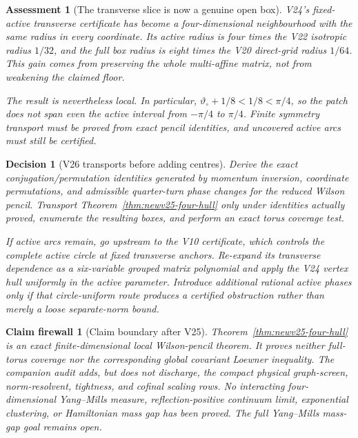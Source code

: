 \documentclass[11pt,oneside]{article}
\newtheorem{assessment}[theorem]{Assessment}
\newtheorem{firewall}[theorem]{Claim firewall}
\newtheorem{decision}[theorem]{Decision}
\theoremstyle{definition}
\theoremstyle{remark}
\begin{document}
\begin{assessment}[The transverse slice is now a genuine open box]
\label{ass:newv25}
V24's fixed-active transverse certificate has become a
four-dimensional neighbourhood with the same radius in every
coordinate.  Its active radius is four times the V22 isotropic
radius \(1/32\), and the full box radius is eight times the V20
direct-grid radius \(1/64\).  This gain comes from preserving the
whole multi-affine matrix, not from weakening the claimed floor.

The result is nevertheless local.  In particular,
\(\vartheta_\circ+1/8<1/8<\pi/4\), so the patch does not span even
the active interval from \(-\pi/4\) to \(\pi/4\).  Finite symmetry
transport must be proved from exact pencil identities, and uncovered
active arcs must still be certified.
\end{assessment}

\begin{decision}[V26 transports before adding centres]
\label{dec:newv25-next}
Derive the exact conjugation/permutation identities generated by
momentum inversion, coordinate permutations, and admissible
quarter-turn phase changes for the reduced Wilson pencil.  Transport
Theorem~\ref{thm:newv25-four-hull} only under identities actually
proved, enumerate the resulting boxes, and perform an exact torus
coverage test.

If active arcs remain, go upstream to the V10 certificate, which
controls the complete active circle at fixed transverse anchors.
Re-expand its transverse dependence as a six-variable grouped
matrix polynomial and apply the V24 vertex hull uniformly in the
active parameter.  Introduce additional rational active phases only
if that circle-uniform route produces a certified obstruction rather
than merely a loose separate-norm bound.
\end{decision}

\begin{firewall}[Claim boundary after V25]
\label{fire:newv25-final}
Theorem~\ref{thm:newv25-four-hull} is an exact finite-dimensional
local Wilson-pencil theorem.  It proves neither full-torus coverage
nor the corresponding global covariant Loewner inequality.  The
companion audit adds, but does not discharge, the compact physical
graph-screen, norm-resolvent, tightness, and cofinal scaling rows.
No interacting four-dimensional Yang--Mills measure,
reflection-positive continuum limit, exponential clustering, or
Hamiltonian mass gap has been proved.  The full Yang--Mills
mass-gap goal remains open.
\end{firewall}
\end{document}
